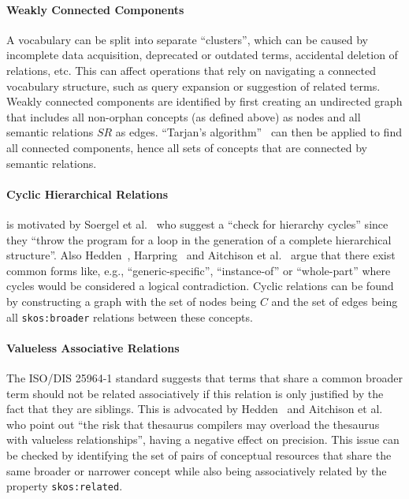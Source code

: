 \paragraph{Weakly Connected Components}

A vocabulary can be split into separate ``clusters'', which can be caused by incomplete data acquisition, deprecated or outdated terms, accidental deletion of relations, etc. This can affect operations that rely on navigating a connected vocabulary structure, such as query expansion or suggestion of related terms.
Weakly connected components are identified by first creating an undirected graph that includes all non-orphan concepts (as defined above) as nodes and all semantic relations $SR$ as edges. ``Tarjan’s algorithm''~\cite{Hopcroft1973} can then be applied to find all connected components, hence all sets of concepts that are connected by semantic relations.

\paragraph{Cyclic Hierarchical Relations}

is motivated by Soergel et al.~\cite{Soergel2002} who suggest a ``check for hierarchy cycles'' since they ``throw the program for a loop in the generation of a complete hierarchical structure''. Also Hedden~\cite{Hedden2010}, Harpring~\cite{Harpring2010} and Aitchison et al.~\cite{Aitchison2000} argue that there exist common forms like, e.g., ``generic-specific'', ``instance-of'' or ``whole-part'' where cycles would be considered a logical contradiction.
Cyclic relations can be found by constructing a graph with the set of nodes being $C$ and the set of edges being all \texttt{skos:broader} relations between these concepts.

\paragraph{Valueless Associative Relations}

The ISO/DIS 25964-1 standard \cite{ISO25964-1:2011} suggests that terms that share a common broader term should not be related associatively if this relation is only justified by the fact that they are siblings. This is advocated by Hedden~\cite{Hedden2010} and Aitchison et al.~\cite{Aitchison2000} who point out ``the risk that thesaurus compilers may overload the thesaurus with valueless relationships'', having a negative effect on precision.
This issue can be checked by identifying the set of pairs of conceptual resources that share the same broader or narrower concept while also being associatively related by the property \texttt{skos:related}.

